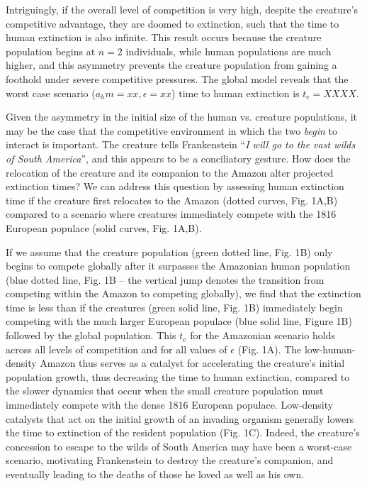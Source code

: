 \documentclass{article}[10pt]
\begin{document}
Intriguingly, if the overall level of competition is very high, despite the creature's competitive advantage, they are doomed to extinction, such that the time to human extinction is also infinite.
This result occurs because the creature population begins at $n=2$ individuals, while human populations are much higher, and this asymmetry prevents the creature population from gaining a foothold under severe competitive pressures.
The global model reveals that the worst case scenario ($a_hm=xx,\epsilon=xx$) time to human extinction is $t_e = XXXX$.

Given the asymmetry in the initial size of the human vs. creature populations, it may be the case that the competitive environment in which the two \emph{begin} to interact is important.
The creature tells Frankenstein ``\emph{I will go to the vast wilds of South America}'', and this appears to be a conciliatory gesture.
How does the relocation of the creature and its companion to the Amazon alter projected extinction times?
We can address this question by assessing human extinction time if the creature first relocates to the Amazon (dotted curves, Fig. 1A,B) compared to a scenario where creatures immediately compete with the 1816 European populace (solid curves, Fig. 1A,B).

If we assume that the creature population (green dotted line, Fig. 1B) only begins to compete globally after it surpasses the Amazonian human population (blue dotted line, Fig. 1B -- the vertical jump denotes the transition from competing within the Amazon to competing globally), we find that the extinction time is less than if the creatures (green solid line, Fig. 1B) immediately begin competing  with the much larger European populace (blue solid line, Figure 1B) followed by the global population.
This $t_e$ for the Amazonian scenario holds across all levels of competition and for all values of $\epsilon$ (Fig. 1A).
The low-human-density Amazon thus serves as a catalyst for accelerating the creature's initial population growth, thus decreasing the time to human extinction, compared to the slower dynamics that occur when the small creature population must immediately compete with the dense 1816 European populace.
Low-density catalysts that act on the initial growth of an invading organism generally lowers the time to extinction of the resident population (Fig. 1C).
Indeed, the creature's concession to escape to the wilds of South America may have been a worst-case scenario, motivating Frankenstein to destroy the creature's companion, and eventually leading to the deaths of those he loved as well as his own.
\end{document}
